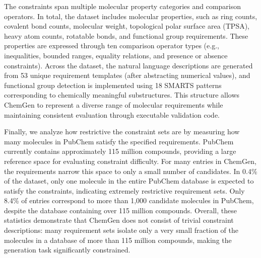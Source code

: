 \documentclass[10pt]{article} %
\begin{document}
The constraints span multiple molecular property categories and comparison operators. In total, the dataset includes molecular properties, such as ring counts, covalent bond counts, molecular weight, topological polar surface area (TPSA), heavy atom counts, rotatable bonds, and functional group requirements. These properties are expressed through ten comparison operator types (e.g., inequalities, bounded ranges, equality relations, and presence or absence constraints). Across the dataset, the natural language descriptions are generated from 53 unique requirement templates (after abstracting numerical values), and functional group detection is implemented using 18 SMARTS patterns corresponding to chemically meaningful substructures. This structure allows ChemGen to represent a diverse range of molecular requirements while maintaining consistent evaluation through executable validation code.

Finally, we analyze how restrictive the constraint sets are by measuring how many molecules in PubChem satisfy the specified requirements. PubChem currently contains approximately 115 million compounds, providing a large reference space for evaluating constraint difficulty.  For many entries in ChemGen, the requirements narrow this space to only a small number of candidates. In 0.4\% of the dataset, only one molecule in the entire PubChem database is expected to satisfy the constraints, indicating extremely restrictive requirement sets. Only 8.4\% of entries correspond to more than 1,000 candidate molecules in PubChem, despite the database containing over 115 million compounds. Overall, these statistics demonstrate that ChemGen does not consist of trivial constraint descriptions: many requirement sets isolate only a very small fraction of the molecules in a database of more than 115 million compounds, making the generation task significantly constrained.

\end{document}
